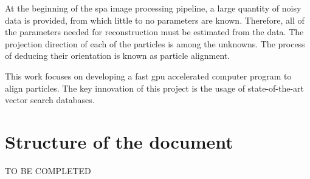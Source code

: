 \documentclass[../main.tex]{subfiles}
\begin{document}
At the beginning of the \gls{spa} image processing pipeline, a large quantity of noisy data is provided, from which little to no parameters are known. Therefore, all of the parameters needed for reconstruction must be estimated from the data. The projection direction of each of the particles is among the unknowns. The process of deducing their orientation is known as particle alignment.

This work focuses on developing a fast \gls{gpu} accelerated computer program to align particles. The key innovation of this project is the usage of state-of-the-art vector search databases.

\section{Structure of the document}
TO BE COMPLETED
\end{document}
